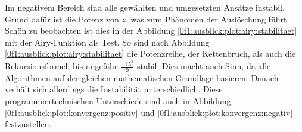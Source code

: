 Im negativem Bereich sind alle gewählten und umgesetzten Ansätze
instabil. Grund dafür ist die Potenz von $z$, was zum Phänomen der
Auslöschung \cite{0f1:SeminarNumerik} führt.
%
Schön zu beobachten ist dies in der Abbildung
\ref{0f1:ausblick:plot:airy:stabilitaet} mit der Airy-Funktion als
Test.
So sind nach Abbildung \ref{0f1:ausblick:plot:airy:stabilitaet} die
Potenzreihe, der Kettenbruch, als auch die Rekursionsformel, bis
ungefähr $\frac{-15^3}{9}$ stabil.
Dies macht auch Sinn, da alle Algorithmen auf der gleichen
mathematischen Grundlage basieren.
Danach verhält sich allerdings die Instabilität unterschiedlich.
Diese programmiertechnischen Unterschiede sind auch in Abbildung
\ref{0f1:ausblick:plot:konvergenz:positiv} und
\ref{0f1:ausblick:plot:konvergenz:negativ} festzustellen.





